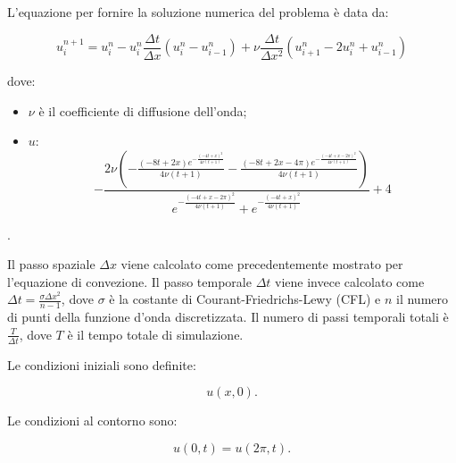 \noindent
L’equazione per fornire la soluzione numerica del problema è data da: 

\begin{equation}
u_i^{n+1} = u_i^n - u_i^n \frac{\Delta t}{\Delta x} (u_i^n - u_{i-1}^n) + \nu \frac{\Delta t}{\Delta x^2}(u_{i+1}^n - 2u_i^n + u_{i-1}^n)
\end{equation}

\noindent
dove: 
\begin{itemize}
\item $\nu$ è il coefficiente di diffusione dell'onda;
\item $u$:
\begin{equation} 
- \frac{2\nu\left(-\frac{(-8t + 2x) e^{-\frac{(-4t + x)^2}{4\nu(t + 1)}}}{4\nu(t + 1)} - \frac{(-8t + 2x - 4\pi) e^{-\frac{(-4t + x - 2\pi)^2}{4\nu(t + 1)}}}{4\nu(t + 1)} \right)}{e^{-\frac{(-4t + x - 2\pi)^2}{4\nu(t + 1)}} + e^{-\frac{(-4t + x)^2}{4\nu(t + 1)}}} + 4 
\end{equation}
\end{itemize}
.


\noindent
Il passo spaziale $\Delta x$ viene calcolato come precedentemente mostrato per l'equazione di convezione. Il passo temporale $\Delta t$ viene invece calcolato come $\Delta t = \frac{\sigma\Delta x^2}{n - 1}$, dove $\sigma$ è la
costante di Courant-Friedrichs-Lewy (CFL) e $n$ il numero di punti della funzione d'onda discretizzata. Il numero di passi temporali totali è $\frac{T}{\Delta t}$, dove $T$ è il tempo totale di simulazione.

\noindent
Le condizioni iniziali sono definite:

\begin{equation}
u(x, 0).
\end{equation}

\noindent
Le condizioni al contorno sono: 

\begin{equation}
u(0,t) = u(2\pi,t).
\end{equation}


